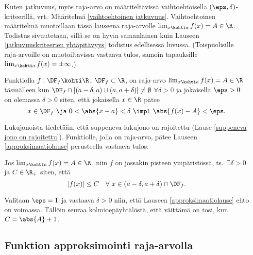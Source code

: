 Kuten jatkuvuus, myös raja-arvo on määriteltävissä vaihtoehtoisella 
$(\eps,\delta)$-kritee\-rillä, vrt.\ Määritelmä \ref{vaihtoehtoinen jatkuvuus}. Vaihtoehtoinen
määritelmä muotoillaan tässä lauseena raja-arvolle $\lim_{x\kohti a} f(x)= A\in\R$. Todistus
sivuutetaan, sillä se on hyvin samanlainen kuin Lauseen \ref{jatkuvuuskriteerien yhtäpitävyys}
todistus edellisessä luvussa. (Toispuolisille raja-arvoille on muotoiltavissa vastaava tulos,
samoin tapauksille $\lim_{x\kohti a} f(x) = \pm\infty$.)
\begin{*Lause}  \label{approksimaatiolause}
 
Funktiolla $f:\DF_f\kohti\R$, $\DF_f\subset\R$, on raja-arvo $\lim_{x\kohti a} f(x)=A\in\R$
täsmälleen kun $\DF_f\cap[(a-\delta,a)\cup(a,a+\delta)]\neq\emptyset$ $\forall \delta>0$ ja
jokaisella $\eps>0$ on olemassa $\delta>0$ siten, että jokaisella $x\in\R$ pätee
\[
x\in\DF_f \ \ja \ 0<\abs{x-a}<\delta \ \impl \ \abs{f(x)-A}<\eps.
\]
\end{*Lause}
Lukujonoista tiedetään, että suppeneva lukujono on rajoitettu 
(Lause \ref{suppeneva jono on rajoitettu}). Funktiolle, jolla on raja-arvo, pätee Lauseen
\ref{approksimaatiolause} perusteella vastaava tulos:
\begin{Lause} \label{raja-arvo ja rajoitettu funktio}  
Jos $\lim_{x \kohti a} f(x) = A\in\R$, niin $f$ on  jossakin pisteen
ympäristössä, ts.\ $\exists \delta>0$ ja $C\in\R_+$ siten, että
\[ 
|f(x)| \le C \quad \forall\ x\in(a-\delta,a+\delta)\cap\DF_f. 
\]
\end{Lause}
\tod Valitaan $\eps=1$ ja vastaava $\delta>0$ niin, että Lauseen \ref{approksimaatiolause}
ehto on voimassa. Tällöin seuraa kolmioepäyhtälöstä, että väittämä on tosi, kun
$C=\abs{A}+1$. \loppu

\subsection*{Funktion approksimointi raja-arvolla}

